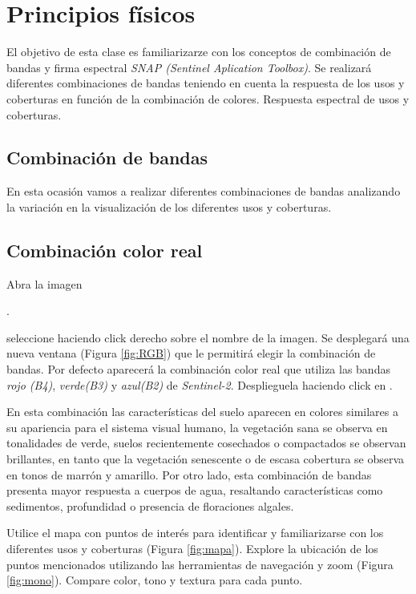 \chapter{Principios físicos}

El objetivo de esta clase es familiarizarze con los conceptos de combinación de bandas y firma espectral \emph{SNAP (Sentinel Aplication Toolbox)}. Se realizará diferentes combinaciones de bandas teniendo en cuenta la respuesta de los usos y coberturas en función de la combinación de colores. Respuesta espectral de usos y coberturas.





\section{Combinación de bandas}
En esta ocasión vamos a realizar diferentes combinaciones de bandas analizando la variación en la visualización de los diferentes usos y coberturas.


\section{Combinación color real}\label{sec:colorreal}

Abra la imagen \begin{center} .
\end{center} seleccione  haciendo click derecho sobre el nombre de la imagen. Se desplegará una nueva ventana (Figura \ref{fig:RGB}) que le permitirá elegir la combinación de bandas. Por defecto aparecerá la combinación color real que utiliza las bandas \emph{rojo (B4)}, \emph{verde(B3)} y \emph{azul(B2)} de \emph{Sentinel-2}. Desplieguela haciendo click en .

En esta combinación las características del suelo aparecen en colores similares a su apariencia para el sistema visual humano, la vegetación sana se observa en tonalidades de verde, suelos recientemente cosechados o compactados se observan brillantes, en tanto que la vegetación senescente o de escasa cobertura se observa en tonos de marrón y amarillo. Por otro lado, esta combinación de bandas presenta mayor respuesta a cuerpos de agua, resaltando características como sedimentos, profundidad o presencia de floraciones algales.

Utilice el mapa con puntos de interés para identificar y familiarizarse con los diferentes usos y coberturas (Figura \ref{fig:mapa}). Explore la ubicación de los puntos mencionados utilizando las herramientas de navegación y zoom  (Figura \ref{fig:mono}). Compare color, tono y textura para cada punto.


